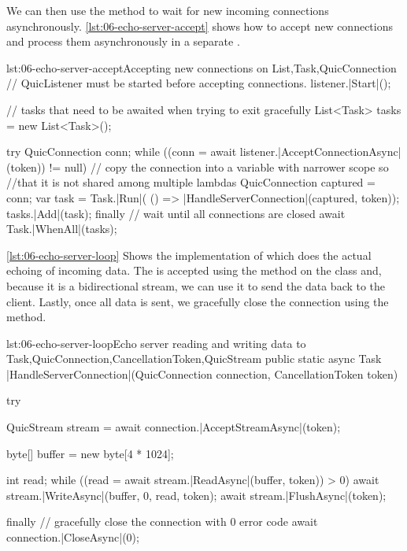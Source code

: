 We can then use the  method to wait for new incoming connections
asynchronously. \autoref{lst:06-echo-server-accept} shows how to accept new connections and process
them asynchronously in a separate .

\begin{myListingCsharp}{lst:06-echo-server-accept}{Accepting new connections on \QuicListener{}}{List,Task,QuicConnection}{}
    // QuicListener must be started before accepting connections.
    listener.|Start|();

    // tasks that need to be awaited when trying to exit gracefully
    List<Task> tasks = new List<Task>();

    try
    {
        QuicConnection conn;
        while ((conn = await listener.|AcceptConnectionAsync|(token)) != null)
        {
            // copy the connection into a variable with narrower scope so
            //that it is not shared among multiple lambdas
            QuicConnection captured = conn;
            var task = Task.|Run|(
                () => |HandleServerConnection|(captured, token));
            tasks.|Add|(task);
        }
    }
    finally
    {
        // wait until all connections are closed
        await Task.|WhenAll|(tasks);
    }
\end{myListingCsharp}

\autoref{lst:06-echo-server-loop} Shows the implementation of  which
does the actual echoing of incoming data. The \QuicStream{} is accepted using the
 method on the \QuicConnection{} class and, because it is a bidirectional
stream, we can use it to send the data back to the client. Lastly, once all data is sent, we
gracefully close the connection using the  method.

\begin{myListingCsharp}{lst:06-echo-server-loop}{Echo server reading and writing data to \QuicStream{}}{Task,QuicConnection,CancellationToken,QuicStream}{}
public static async Task |HandleServerConnection|(QuicConnection connection,
    CancellationToken token)
{
    try
    {
        QuicStream stream = await connection.|AcceptStreamAsync|(token);

        byte[] buffer = new byte[4 * 1024];

        int read;
        while ((read = await stream.|ReadAsync|(buffer, token)) > 0)
        {
            await stream.|WriteAsync|(buffer, 0, read, token);
            await stream.|FlushAsync|(token);
        }
    }
    finally
    {
        // gracefully close the connection with 0 error code
        await connection.|CloseAsync|(0);
    }
}
\end{myListingCsharp}

